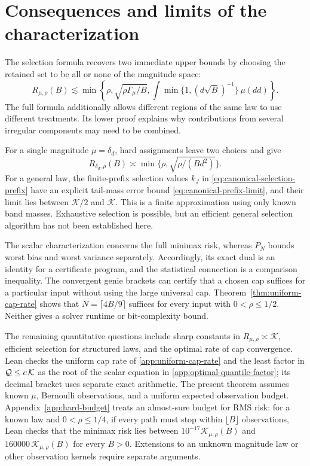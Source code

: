 \section{Consequences and limits of the characterization}\label{sec:discussion}

The selection formula recovers two immediate upper bounds by choosing
the retained set to be all or none of the magnitude space:
\[
 R_{\mu,\rho}(B)\lesssim
 \min\left\{\rho,\sqrt{\rho\Gamma_\mu/B},
 \int\min\{1,(d\sqrt B)^{-1}\}\,\mu(dd)\right\}.
\]
The full formula additionally allows different regions of the same law
to use different treatments. Its lower proof explains why contributions
from several irregular components may need to be combined.

For a single magnitude $\mu=\delta_d$, hard assignments leave two choices
and give
\[
 R_{\delta_d,\rho}(B)\asymp
       \min\{\rho,\sqrt{\rho/(Bd^2)}\}.
\]
For a general law, the finite-prefix selection values $k_J$ in
\eqref{eq:canonical-selection-prefix} have an explicit tail-mass error
bound \eqref{eq:canonical-prefix-limit}, and their limit lies between
$\mathcal K/2$ and $\mathcal K$. This is a finite approximation using only
known band masses. Exhaustive selection is possible, but an efficient
general selection algorithm has not been established here.

The scalar characterization concerns the full minimax risk, whereas
$P_N$ bounds worst bias and worst variance separately. Accordingly, its
exact dual is an identity for a certificate program, and the statistical
connection is a comparison inequality. The convergent genie brackets
can certify that a chosen cap suffices for a particular input without
using the large universal cap. Theorem~\ref{thm:uniform-cap-rate} shows that
$N=\lceil4B/9\rceil$ suffices for every input with $0<\rho\le1/2$.
Neither gives a solver runtime or bit-complexity bound.

The remaining quantitative questions include sharp constants in
$R_{\mu,\rho}\asymp\mathcal K$, efficient selection for structured laws,
and the optimal rate of cap convergence. Lean checks the uniform cap rate
of \cref{app:uniform-cap-rate} and the least factor in
$\mathcal Q\le c\,\mathcal K$ as the root of the scalar equation in
\cref{app:optimal-quantile-factor}; its decimal bracket uses separate
exact arithmetic.
The present theorem assumes known $\mu$, Bernoulli observations, and a
uniform expected observation budget. Appendix~\ref{app:hard-budget} treats an
almost-sure budget for RMS risk: for a known law and $0<\rho\le1/4$, if
every path must stop within $\lfloor B\rfloor$ observations, Lean checks
that the minimax risk lies between $10^{-17}\mathcal K_{\mu,\rho}(B)$
and $160000\,\mathcal K_{\mu,\rho}(B)$ for every $B>0$. Extensions to
an unknown magnitude law or other observation kernels require separate
arguments.

